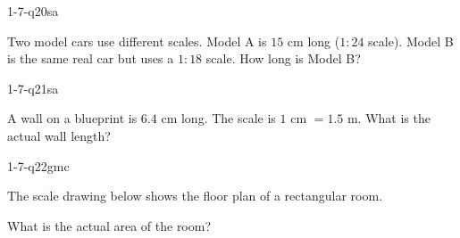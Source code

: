 \begin{practiceQuestion}{1-7-q20}{sa}
\begin{questionText}
Two model cars use different scales. Model A is $15$ cm long ($1 : 24$ scale). Model B is the same real car but uses a $1 : 18$ scale. How long is Model B?
\end{questionText}
\end{practiceQuestion}

\begin{practiceQuestion}{1-7-q21}{sa}
\begin{questionText}
A wall on a blueprint is $6.4$ cm long. The scale is $1$ cm $= 1.5$ m. What is the actual wall length?
\end{questionText}
\end{practiceQuestion}


\begin{practiceQuestion}{1-7-q22}{gmc}
\begin{questionText}
The scale drawing below shows the floor plan of a rectangular room.

\begin{center}
\end{center}

What is the actual area of the room?
\end{questionText}
\end{practiceQuestion}

